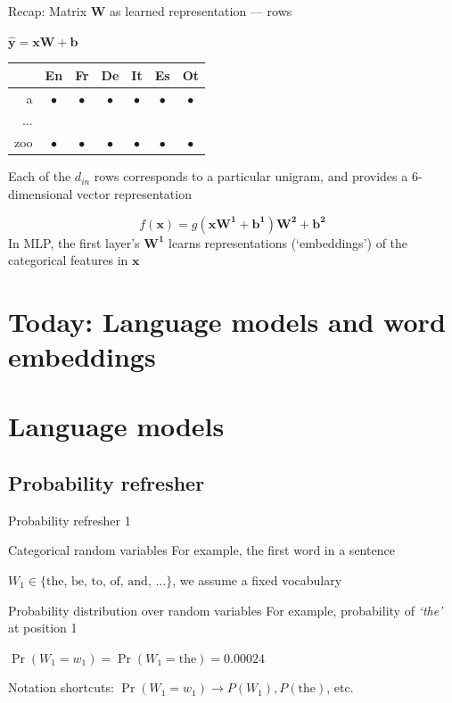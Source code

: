 \documentclass[12pt,aspectratio=169,handout]{beamer}
\begin{document}
\begin{frame}{Recap: Matrix $\bm{W}$ as learned representation --- rows}

\begin{block}{$\bm{\hat{y}} = \bm{x} \bm{W} + \bm{b}$}
\begin{tabular}{r|cccccc}
	& En & Fr & De & It & Es & Ot \\ \midrule
	a & $\bullet$ & $\bullet$ & $\bullet$ & $\bullet$ & $\bullet$ & $\bullet$ \\
	... & & & & & & \\
	zoo & $\bullet$ & $\bullet$ & $\bullet$ & $\bullet$ & $\bullet$ & $\bullet$ \\
\end{tabular}

Each of the $d_{in}$ rows corresponds to a particular unigram, and provides a 6-dimensional vector representation	
\end{block}

\pause
\vspace{-1em}
$$f(\bm{x}) = g \left(
\bm{x} \bm{W^1} + \bm{b^1}
\right)
\bm{W^2} + \bm{b^2}$$
In MLP, the first layer's $\bm{W^1}$ learns representations (`embeddings') of the categorical features in $\bm{x}$
	
	
\end{frame}

\section*{Today: Language models and word embeddings}

\section{Language models}

\subsection{Probability refresher}


\begin{frame}{Probability refresher 1}
	
\begin{block}{Categorical random variables}
	For example, the first word in a sentence
	
	$W_1 \in \{ \textrm{the, be, to, of, and, } \ldots \}$, we assume a fixed vocabulary
\end{block}

\pause

\begin{block}{Probability distribution over random variables}
	For example, probability of \emph{`the'} at position 1
	
	$\Pr(W_1 = w_1) = \Pr(W_1 = \text{the}) = 0.00024$
	
	\pause
	
	Notation shortcuts: $\Pr(W_1 = w_1) \to P(W_1), P(\text{the})$, etc.
\end{block}
	
\end{frame}
\end{document}
